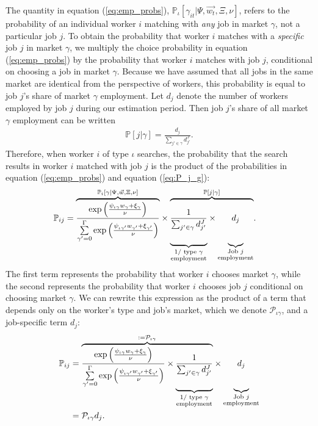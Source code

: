 \documentclass[12pt]{article}
\def\ig{\iota\gamma}
\def\g{\gamma}
\def\i{\iota}
\def\Pig{\frac{\exp \left( \frac{\psi_{\ig} 
			w_{\g} + \xi_{\g}}{\nu} \right) }{ \sum\limits_{\g'=0}^{\Gamma} \exp \left( \frac{\psi_{\ig'} w_{\g'} + \xi_{\g'}}{\nu} \right) }}
\renewcommand{\P}{\mathbb {P}}
\theoremstyle{definition}
\theoremstyle{plain}
\begin{document}
The quantity in equation (\ref{eq:emp_probs}), $\P_{\i}[\g_{it}|\Psi,\vec{w_t},\Xi,\nu]$, refers to the probability of an individual worker $i$ matching with \emph{any} job in market $\g$, not a particular job $j$. To obtain the probability that worker $i$ matches with a \emph{specific} job $j$ in market $\g$, we multiply the choice probability in equation (\ref{eq:emp_probs}) by the probability that worker $i$ matches with job $j$, conditional on choosing a job in market $\g$. Because we have assumed that all jobs in the same market are identical from the perspective of workers, this probability is equal to job $j$'s share of market $\g$ employment. Let $d_j$ denote the number of workers employed by job $j$ during our estimation period. Then job $j$'s share of all market $\g$ employment can be written 
\begin{align}
	\P[j|\g] = \frac{d_j}{\sum_{j' \in \g} d_{j'}^{J}}. \label{eq:P_j_g}
\end{align}  
Therefore, when worker $i$ of type $\i$ searches, the probability that the search results in worker $i$ matched with job $j$ is the product of the probabilities in equation (\ref{eq:emp_probs}) and equation (\ref{eq:P_j_g}): 
\begin{align}
\P_{ij}  &= 
\overset{\P_i[\g | \Psi,\vec{w},\Xi,\nu] }{\overbrace{\Pig }} 
\times \overset{\P[j|\g]}{\overbrace{\underset{\substack{1/ \text{ type } \g \\ \text{employment}  }}{ 	
			\underbrace{ \vphantom{\Pig} \frac{1}{\sum_{j' \in \g} d_{j'}^{J} } }} 
		\times \underset{\substack{\text{Job }j \\  \text{employment}}}{\underbrace{ \vphantom{\Pig} d_j}}    }} .
\end{align}
The first term represents the probability that worker $i$ chooses market $\gamma$, while the second represents the probability that worker $i$ chooses job $j$ conditional on choosing market $\gamma$. We can rewrite this expression as the product of a term that depends only on the worker's type and job's market, which we denote $\mathcal{P}_{\ig}$, and a job-specific term $d_j$:
\begin{align}
\P_{ij} &= \overset{ := \mathcal{P}_{\ig}}{\overbrace{
		\Pig 
		\times  \underset{\substack{1/ \text{ type } \g \\ \text{employment}  }}{ 	
			\underbrace{{ \vphantom{\Pig} \frac{1}{\sum_{j' \in \g} d_{j'}^{J} } }}}    }} \times \underset{\substack{\text{Job }j \\  \text{employment}}}{\underbrace{ \vphantom{\Pig} d_j}} \\
		&=  \mathcal{P}_{\ig} d_j . \nonumber \label{eq:P_ij}
\end{align}
\end{document}
